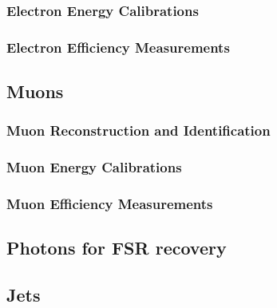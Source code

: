 \subsubsection{Electron Energy Calibrations}

%
\subsubsection{Electron Efficiency Measurements}
\label{sec:eleEffMeas}

%
%
\subsection{Muons}
%
\subsubsection{Muon Reconstruction and Identification}
\label{sec:muonReco}

%
%
% 
%
% 
%
\subsubsection{Muon Energy Calibrations}
 
%
\subsubsection{Muon Efficiency Measurements}
\label{sec:muonEffMeas}

%
%
%
%
\subsection{Photons for FSR recovery}
\label{sec:FSRphotons}

%
\subsection{Jets}
\label{sec:jets}

%
%

